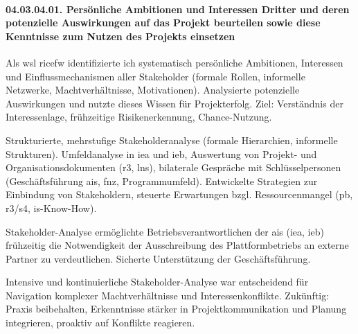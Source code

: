 \paragraph*{04.03.04.01. Persönliche Ambitionen und Interessen Dritter und deren potenzielle Auswirkungen auf das Projekt beurteilen sowie diese Kenntnisse zum Nutzen des Projekts einsetzen}
\label{para:04.03.04.01_PersönlicheAmbitionenUndInteressenDritter}

\par Als \gls{wsl} \gls{ricefw} identifizierte ich systematisch persönliche Ambitionen, Interessen und Einflussmechanismen aller Stakeholder (formale Rollen, informelle Netzwerke, Machtverhältnisse, Motivationen). Analysierte potenzielle Auswirkungen und nutzte dieses Wissen für Projekterfolg. Ziel: Verständnis der Interessenlage, frühzeitige Risikenerkennung, Chance-Nutzung.

\par Strukturierte, mehrstufige Stakeholderanalyse (formale Hierarchien, informelle Strukturen). Umfeldanalyse in \gls{iea} und \gls{ieb}, Auswertung von Projekt- und Organisationsdokumenten (\gls{r3}, \gls{lns}), bilaterale Gespräche mit Schlüsselpersonen (Geschäftsführung \gls{ais}, \gls{fnz}, Programmumfeld). Entwickelte Strategien zur Einbindung von Stakeholdern, steuerte Erwartungen bzgl. Ressourcenmangel (\gls{pb}, \gls{r3}/\gls{s4}, \gls{is}-Know-How).

\par Stakeholder-Analyse ermöglichte Betriebsverantwortlichen der \gls{ais} (\gls{iea}, \gls{ieb}) frühzeitig die Notwendigkeit der Ausschreibung des Plattformbetriebs an externe Partner zu verdeutlichen. Sicherte Unterstützung der Geschäftsführung.

\par Intensive und kontinuierliche Stakeholder-Analyse war entscheidend für Navigation komplexer Machtverhältnisse und Interessenkonflikte. Zukünftig: Praxis beibehalten, Erkenntnisse stärker in Projektkommunikation und Planung integrieren, proaktiv auf Konflikte reagieren.